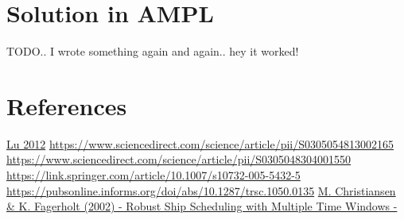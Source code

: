 \documentclass[a4paper,12pt]{article}
\begin{document}
\section{Solution in AMPL}
TODO.. I wrote something again and again.. hey it worked!

\section{References} \label{sec:Ref}

\href{http://www-bcf.usc.edu/~maged/publications/MultiplePickup.pdf}{Lu 2012} \newline
\url{https://www.sciencedirect.com/science/article/pii/S0305054813002165} \newline
\url{https://www.sciencedirect.com/science/article/pii/S0305048304001550} \newline
\url{https://link.springer.com/article/10.1007/s10732-005-5432-5} \newline
\url{https://pubsonline.informs.org/doi/abs/10.1287/trsc.1050.0135} \newline
\href{https://onlinelibrary.wiley.com/doi/epdf/10.1002/nav.10033}{M. Christiansen \& K. Fagerholt (2002) - Robust Ship Scheduling with Multiple Time Windows - } \newline
\end{document}
